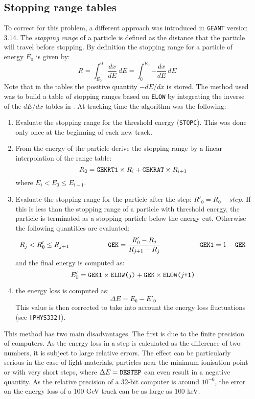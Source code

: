 \subsection{Stopping range tables}
To correct for this problem, a different approach was introduced in
{\tt GEANT} version 3.14. The {\it stopping range} of a particle is
defined as the distance that the particle will travel before stopping.
By definition the stopping range for a particle of energy $E_0$ is given
by:
\[ R = \int_{E_0}^{0}{\frac{dx}{dE} \: dE} =
\int_0^{E_0}{-\frac{dx}{dE} \: dE}
\]
Note that in the tables the positive quantity $-dE/dx$ is stored. The
method used was to build a table of stopping ranges based on {\tt ELOW}
by integrating the inverse of the $dE/dx$ tables in .
At tracking time the algorithm was the following:
\begin{enumerate}
\item Evaluate the stopping range for the threshold energy ({\tt STOPC}).
This was done only once at the beginning of each new track.
\item From the energy of the particle derive the stopping range by
a linear interpolation of the range table:
\[ R_0 = \mbox{\tt GEKRT1} \times R_i + \mbox{\tt GEKRAT} \times R_{i+1} \]
where $E_i < E_0 \leq E_{i+1}$.
\item Evaluate the stopping range for the particle after the step:
$R'_0 = R_0 - step$. If this is less than the stopping range of a
particle with threshold energy, the particle is terminated as a stopping
particle below the energy cut. Otherwise the following quantities are
evaluated:
\[
R_j < R'_0 \leq R_{j+1} \hspace{2cm}
\mbox{\tt GEK} = \displaystyle{\frac{R'_0-R_j}{R_{j+1}-R_j}}  \hspace{2cm}
\mbox{\tt GEK1} = 1 - \mbox{\tt GEK}
\]
and the final energy is computed as:
\[ E'_0 = \mbox{\tt GEK1} \times \mbox{\tt ELOW(}j\mbox{\tt )} +
          \mbox{\tt GEK} \times \mbox{\tt ELOW(}j\mbox{\tt +1)}
\]
\item the energy loss is computed as:
\[
\Delta E = E_0-E'_0 \]
This value is then corrected to take into account the energy loss
fluctuations (see {\tt [PHYS332]}).
\end{enumerate}
This method has two main disadvantages. The first is due to the finite
precision of computers. As the energy loss in a step is calculated as
the difference of two numbers, it is subject to large relative errors.
The effect can be particularly serious in the case of light materials,
particles near the minimum ionisation point or with very short steps, 
where $\Delta E = \mbox{\tt DESTEP}$ can even result in a negative
quantity. As the relative precision of a 32-bit computer is around
$10^{-6}$, the error on the energy loss of a 100 GeV
track can be as large as 100 keV.
 
